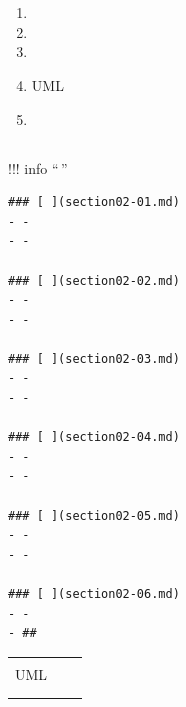 \section{}\label{section}

\subsection{}\label{section-1}

\begin{enumerate}
\def\labelenumi{\arabic{enumi}.}
\tightlist
\item
\item
\item
\item
  UML
\item
\end{enumerate}

\subsection{}\label{section-2}

\subsection{}\label{section-3}

!!! info ``\,''

\begin{verbatim}
### [ ](section02-01.md)
- - 
- - 

### [ ](section02-02.md)
- - 
- - 

### [ ](section02-03.md)
- - 
- - 

### [ ](section02-04.md)
- - 
- - 

### [ ](section02-05.md)
- - 
- - 

### [ ](section02-06.md)
- - 
- ## 
\end{verbatim}

\begin{longtable}[]{@{}lll@{}}
\toprule\noalign{}
\endhead
\bottomrule\noalign{}
\endlastfoot
& & \\
UML & & \\
& & \\
& & \\
\end{longtable}

\subsection{}\label{section-4}

